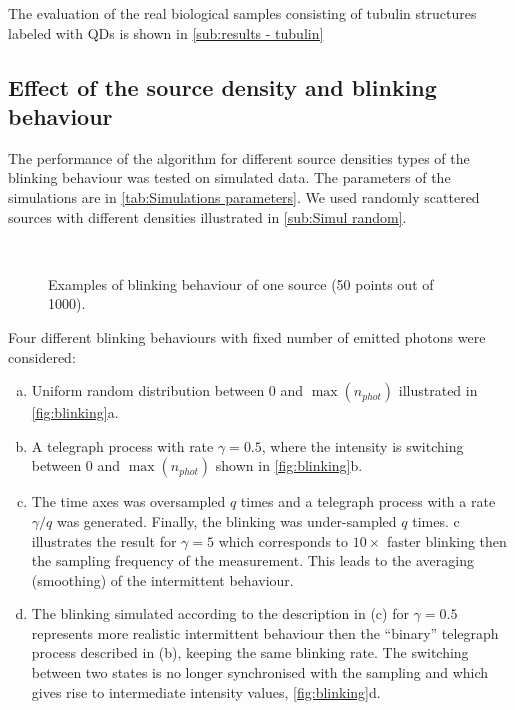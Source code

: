 The evaluation of the real biological samples consisting of tubulin structures labeled with QDs is shown in \autoref{sub:results - tubulin}


\subsection{Effect of the source density and blinking behaviour \label{sub:results - blinking behaviour}}
The performance of the algorithm for different source densities types of the blinking behaviour was tested on simulated data. The parameters of the simulations are in \autoref{tab:Simulations parameters}. We used randomly scattered sources with different densities illustrated in \autoref{sub:Simul random}.

\begin{figure}[!h]
	\centering
	\newcommand{\sizef}{.35}
	\\
	\subfloat[telegraph oversampled ($\gamma=5$)]{
	\texttt{[image: \\qd S455/images/blinkmatS565]}} %
	\caption{Examples of blinking behaviour of one source (50 points out of 1000).}
	\label{fig:blinking}
\end{figure}

Four different blinking behaviours with fixed number of emitted photons were considered: 
%
\begin{enumerate}[(a)]
	\item
	Uniform random distribution between $0$ and $\max(n_{phot})$ illustrated in  \autoref{fig:blinking}a. 
	\item
	A telegraph process with rate $\gamma=0.5$, where the intensity is switching between $0$ and $\max(n_{phot})$ shown in \autoref{fig:blinking}b.
	\item
	The time axes was oversampled $q$ times and a telegraph process with a rate $\gamma/q$ was generated. Finally, the blinking was under-sampled $q$ times. c illustrates the result for $\gamma=5$ which corresponds to $10\times$ faster blinking then the sampling frequency of the measurement. This leads to the averaging (smoothing) of the intermittent behaviour.
	\item
	The blinking simulated according to the description in (c) for $\gamma=0.5$ represents more realistic intermittent behaviour then the ``binary'' telegraph process described in (b), keeping the same blinking rate. The switching between two states is no longer synchronised with the sampling and which gives rise to intermediate intensity values, \autoref{fig:blinking}d. 
\end{enumerate}
	
